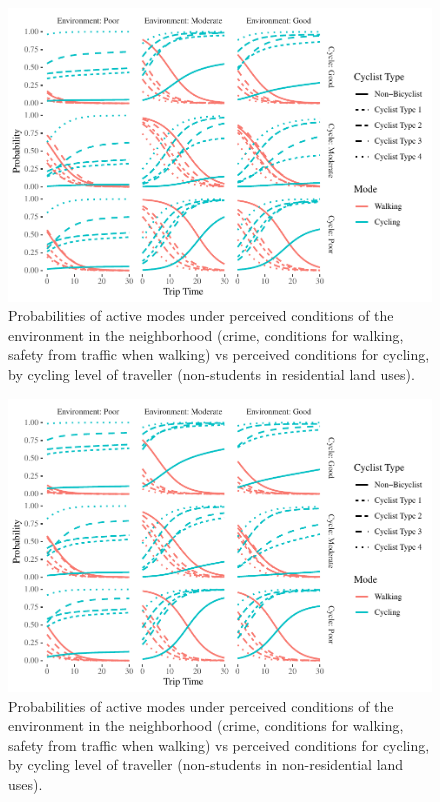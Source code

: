 \documentclass[]{elsarticle} %
\makeatletter
\def\maxwidth{\ifdim\Gin@nat@width>\linewidth\linewidth
\else\Gin@nat@width\fi}
\let\Oldincludegraphics\includegraphics
\renewcommand{\includegraphics}[1]{\Oldincludegraphics[width=\maxwidth]{#1}}
\makeatother
\begin{document}
\begin{figure}
\centering
\includegraphics{Active-Travel-in-Bangladesh_files/figure-latex/figure-probabilities-perceptions-active-non-student-residential-1.pdf}
\caption{\label{fig:probabilities-perceptions-active-non-student-residential}Probabilities
of active modes under perceived conditions of the environment in the
neighborhood (crime, conditions for walking, safety from traffic when
walking) vs perceived conditions for cycling, by cycling level of
traveller (non-students in residential land uses).}
\end{figure}

\begin{figure}
\centering
\includegraphics{Active-Travel-in-Bangladesh_files/figure-latex/figure-probabilities-perceptions-active-non-student-non-residential-1.pdf}
\caption{\label{fig:probabilities-perceptions-active-non-student-non-residential}Probabilities
of active modes under perceived conditions of the environment in the
neighborhood (crime, conditions for walking, safety from traffic when
walking) vs perceived conditions for cycling, by cycling level of
traveller (non-students in non-residential land uses).}
\end{figure}
\end{document}
